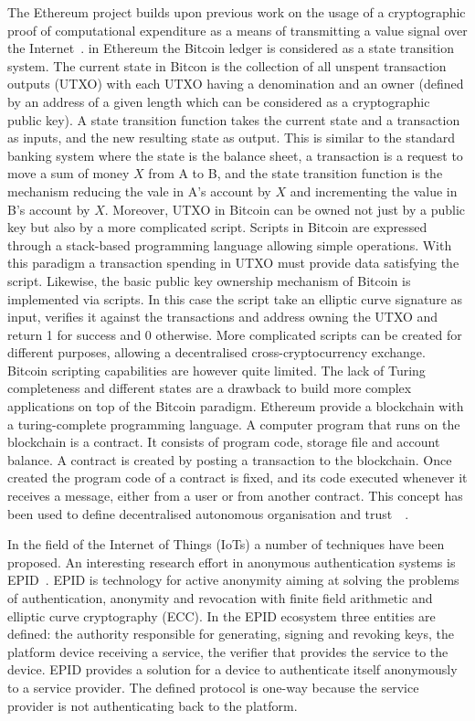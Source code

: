 The Ethereum project builds upon previous work on the usage of a cryptographic proof of computational expenditure as a means of transmitting a value signal over the Internet~\cite{buterin2014next}. in Ethereum the Bitcoin ledger is considered as a state transition system. The current state in Bitcon is the collection of all unspent transaction outputs (UTXO) with each UTXO having a denomination and an owner (defined by an address of a given length which can be considered as a cryptographic public key). A state transition function takes the current state and a transaction as inputs, and the new resulting state as output. This is similar to the standard banking system where the state is the balance sheet, a transaction is a request to move a sum of money $X$ from A to B, and the state transition function is the mechanism reducing the vale in A's account by $X$ and incrementing the value in B's account by $X$.
Moreover, UTXO in Bitcoin can be owned not just by a public key but also by a more complicated script. Scripts in Bitcoin are expressed through a stack-based programming language allowing simple operations. With this paradigm a transaction spending in UTXO must provide data satisfying the script. Likewise, the basic public key ownership mechanism of Bitcoin is implemented via scripts. In this case the script take an elliptic curve signature as input, verifies it against the transactions and address owning the UTXO and return 1 for success and 0 otherwise. More complicated scripts can be created for different purposes, allowing a decentralised cross-cryptocurrency exchange. Bitcoin scripting capabilities are however quite limited. The lack of Turing completeness and different states are a drawback to build more complex applications on top of the Bitcoin paradigm.
Ethereum provide a blockchain with a turing-complete programming language. A computer program that runs on the blockchain is a contract. It consists of program code, storage file and account balance. A contract is created by posting a transaction to the blockchain. Once created the program code of a contract is fixed, and its code executed whenever it receives a message, either from a user or from another contract. This concept has been used to define decentralised autonomous organisation and trust~\cite{slockit}~\cite{kosba2016hawk}.

In the field of the Internet of Things (IoTs) a number of techniques have been proposed. An interesting research effort in anonymous authentication systems is EPID~\cite{ruan2014privacy}. EPID is technology for active anonymity aiming at solving the problems of authentication, anonymity and revocation with finite field arithmetic and elliptic curve cryptography (ECC). In the EPID ecosystem three entities are defined: the authority responsible for generating, signing and revoking keys, the platform device receiving a service, the verifier that provides the service to the device. EPID provides a solution for a device to authenticate itself anonymously to a service provider. The defined protocol is one-way because the service provider is not authenticating back to the platform. 

